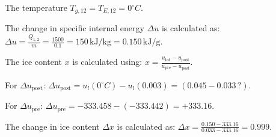 The temperature \( T_{g,12} = T_{E,12} = 0^\circ C \).  

The change in specific internal energy \( \Delta u \) is calculated as:  
\( \Delta u = \frac{Q_{1,2}}{m} = \frac{1500}{0.1} = 150 \, \text{kJ/kg} = 0.150 \, \text{kJ/g} \).  

The ice content \( x \) is calculated using:  
\( x = \frac{u_{\text{tot}} - u_{\text{post}}}{u_{\text{pre}} - u_{\text{post}}} \).  

For \( \Delta u_{\text{post}} \):  
\( \Delta u_{\text{post}} = u_l(0^\circ C) - u_l(0.003) = (0.045 - 0.033 \, \text{?}) \).  

For \( \Delta u_{\text{pre}} \):  
\( \Delta u_{\text{pre}} = -333.458 - (-333.442) = +333.16 \).  

The change in ice content \( \Delta x \) is calculated as:  
\( \Delta x = \frac{0.150 - 333.16}{0.033 - 333.16} = 0.999 \).
